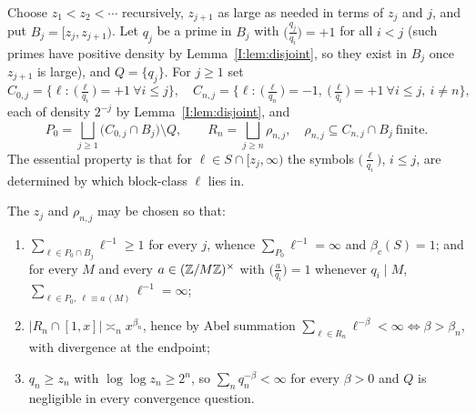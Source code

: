 \begin{definition}\label{I:def:blocks}
Choose $z_1<z_2<\cdots$ recursively, $z_{j+1}$ as large as needed in terms of $z_j$ and $j$,
and put $B_j=[z_j,z_{j+1})$. Let $q_j$ be a prime in $B_j$ with $\bigl(\tfrac{q_j}{q_i}\bigr)=+1$
for all $i<j$ (such primes have positive density by Lemma~\ref{I:lem:disjoint}, so they exist in
$B_j$ once $z_{j+1}$ is large), and $Q=\{q_j\}$. For $j\ge1$ set
\[
C_{0,j}=\bigl\{\ell:\ \bigl(\tfrac{\ell}{q_i}\bigr)=+1\ \forall i\le j\bigr\},
\quad
C_{n,j}=\bigl\{\ell:\ \bigl(\tfrac{\ell}{q_n}\bigr)=-1,\ \bigl(\tfrac{\ell}{q_i}\bigr)=+1\ \forall i\le j,\ i\ne n\bigr\},
\]
each of density $2^{-j}$ by Lemma~\ref{I:lem:disjoint}, and
\[
P_0=\bigsqcup_{j\ge1}\bigl(C_{0,j}\cap B_j\bigr)\setminus Q,
\qquad
R_n=\bigsqcup_{j\ge n}\rho_{n,j},\quad \rho_{n,j}\subseteq C_{n,j}\cap B_j\ \text{finite}.
\]
The essential property is that for $\ell\in S\cap[z_j,\infty)$ the symbols
$\bigl(\tfrac{\ell}{q_i}\bigr)$, $i\le j$, are determined by which block-class $\ell$ lies
in.
\end{definition}

\begin{lemma}\label{I:lem:pieces}
The $z_j$ and $\rho_{n,j}$ may be chosen so that:
\begin{enumerate}
\item $\sum_{\ell\in P_0\cap B_j}\ell^{-1}\ge1$ for every $j$, whence
$\sum_{P_0}\ell^{-1}=\infty$ and $\beta_c(S)=1$; and for every $M$ and every
$a\in(\mathbb{Z}/M\mathbb{Z})^\times$ with $\bigl(\tfrac{a}{q_i}\bigr)=1$ whenever $q_i\mid M$,
$\sum_{\ell\in P_0,\ \ell\equiv a\,(M)}\ell^{-1}=\infty$;
\item $|R_n\cap[1,x]|\asymp_nx^{\beta_n}$, hence by Abel summation
$\sum_{\ell\in R_n}\ell^{-\beta}<\infty\iff\beta>\beta_n$, with divergence at the endpoint;
\item $q_n\ge z_n$ with $\log\log z_n\ge2^n$, so $\sum_nq_n^{-\beta}<\infty$ for every
$\beta>0$ and $Q$ is negligible in every convergence question.
\end{enumerate}
\end{lemma}

